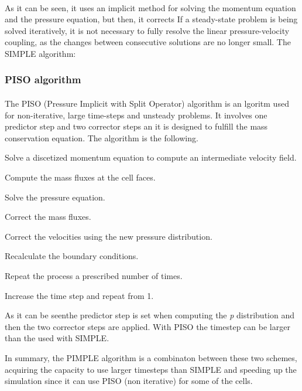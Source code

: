 \paragraph{}As it can be seen, it uses an implicit method for solving the momentum equation and the pressure equation, but then, it corrects 
If a steady-state problem is being solved iteratively, it is not necessary to fully resolve the linear pressure-velocity coupling, as the changes between consecutive solutions are no longer small. The SIMPLE algorithm:

\subsubsection{PISO algorithm}
\paragraph{}The PISO (Pressure Implicit with Split Operator) algorithm is an lgoritm used for non-iterative, large time-steps and unsteady problems. It involves one predictor step and two corrector steps an it is designed to fulfill the mass conservation equation. The algorithm is the following.
\begin{list}
\item Solve a discetized momentum equation to compute an intermediate velocity field.
\item Compute the mass fluxes at the cell faces.
\item Solve the pressure equation.
\item Correct the mass fluxes.
\item Correct the velocities using the new pressure distribution.
\item Recalculate the boundary conditions.
\item Repeat the process a prescribed number of times.
\item Increase the time step and repeat from 1.

\end{list}

As it can be seenthe predictor step is set when computing the \textit{p} distribution and then the two corrector steps are applied. With PISO the timestep can be larger than the used with SIMPLE.

In summary, the PIMPLE algorithm is a combinaton between these two schemes, acquiring the capacity to use larger timesteps than SIMPLE and speeding up the simulation since it can use PISO (non iterative) for some of the cells.
